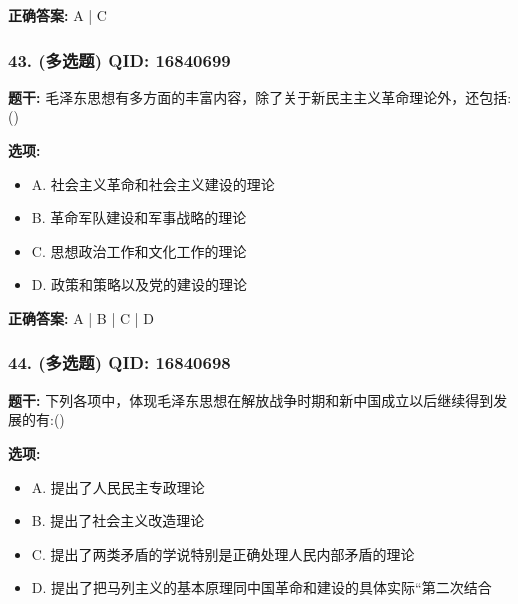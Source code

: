 \documentclass[12pt,UTF8]{ctexart}
\begin{document}
\textbf{正确答案:}
A | C

\vspace{0.3em}\hrulefill\vspace{0.7em}

\subsubsection*{43. (多选题) \small QID: 16840699}

\textbf{题干:}
毛泽东思想有多方面的丰富内容，除了关于新民主主义革命理论外，还包括:()

\textbf{选项:}
\begin{itemize}[leftmargin=*]

  \item A. 社会主义革命和社会主义建设的理论

  \item B. 革命军队建设和军事战略的理论

  \item C. 思想政治工作和文化工作的理论

  \item D. 政策和策略以及党的建设的理论

\end{itemize}

\textbf{正确答案:}
A | B | C | D

\vspace{0.3em}\hrulefill\vspace{0.7em}

\subsubsection*{44. (多选题) \small QID: 16840698}

\textbf{题干:}
下列各项中，体现毛泽东思想在解放战争时期和新中国成立以后继续得到发展的有:()

\textbf{选项:}
\begin{itemize}[leftmargin=*]

  \item A. 提出了人民民主专政理论

  \item B. 提出了社会主义改造理论

  \item C. 提出了两类矛盾的学说特别是正确处理人民内部矛盾的理论

  \item D. 提出了把马列主义的基本原理同中国革命和建设的具体实际“第二次结合

\end{itemize}
\end{document}

